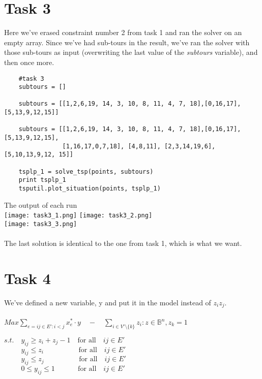 \documentclass[a4paper,10pt]{article}
\begin{document}
\section*{Task 3}
Here we've erased constraint number 2 from task 1 and ran the solver on an empty array. Since we've had sub-tours in the result, we've ran the solver with those sub-tours as input (overwriting the last value of the \emph{subtours} variable), and then once more.
\begin{lstlisting}
    #task 3
    subtours = []
    
    subtours = [[1,2,6,19, 14, 3, 10, 8, 11, 4, 7, 18],[0,16,17],[5,13,9,12,15]]
    
    subtours = [[1,2,6,19, 14, 3, 10, 8, 11, 4, 7, 18],[0,16,17],[5,13,9,12,15],
                [1,16,17,0,7,18], [4,8,11], [2,3,14,19,6], [5,10,13,9,12, 15]]

    tsplp_1 = solve_tsp(points, subtours)
    print tsplp_1
    tsputil.plot_situation(points, tsplp_1)
\end{lstlisting}

The output of each run\\
\texttt{[image: task3\_1.png]}
\texttt{[image: task3\_2.png]}\\
\texttt{[image: task3\_3.png]}\\
\\
The last solution is identical to the one from task 1, which is what we want.

\newpage
\section*{Task 4}
We've defined a new variable, y and put it in the model instead of $z_i z_j$.\\
\\
$Max \sum\limits_{e=ij \in E' : i<j} x^*_e \cdot y \quad - \quad \sum\limits_{i \in V'\setminus \{k\}} z_i : z \in \mathbb{B}^n, z_k = 1$

$s.t.\quad y_{ij} \geq z_i+z_j - 1 \quad \text{for all} \quad ij \in E'$\\
$\phantom{s.t.} \quad y_{ij} \leq z_i\phantom{..............} \quad \text{for all} \quad ij \in E'$\\
$\phantom{s.t.} \quad y_{ij} \leq z_j\phantom{..............} \quad \text{for all} \quad ij \in E'$\\
$\phantom{s.t.} \quad 0 \leq y_{ij} \leq 1\phantom{........} \quad \text{for all} \quad ij \in E'$\\
\end{document}
